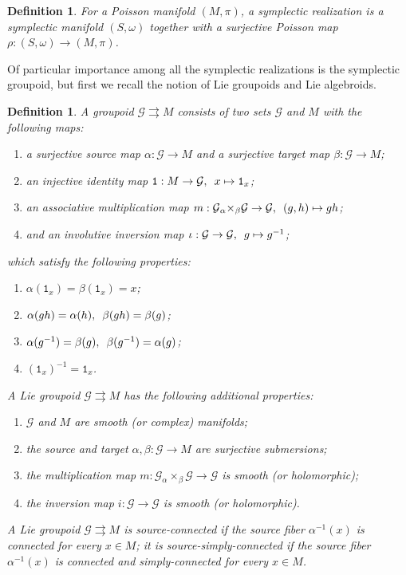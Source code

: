 \documentclass{amsart}
\newtheorem{definition}[theorem]{Definition}
\numberwithin{equation}{section}
\newcommand{\cG}{\mathcal{G}}
\begin{document}
\begin{definition}
  For a Poisson manifold $(M, \pi)$, a symplectic realization is a symplectic manifold $(S, \omega)$ together with a surjective Poisson map $\rho: (S, \omega) \to (M, \pi)$.
\end{definition}

Of particular importance among all the symplectic realizations is the symplectic groupoid, but first we recall the notion of Lie groupoids and Lie algebroids.
\begin{definition} \label{def:groupoid}
  A \emph{groupoid} $\cG\rightrightarrows M$ consists of two sets $\cG$ and $M$ with the following maps:
  \begin{enumerate}
    \item a surjective \emph{source map} $\alpha: \cG \to M$ and a surjective \emph{target map} $\beta: \cG \to M$;
    \item an injective identity map $\mathtt{1}: M \to \cG, \enskip x \mapsto \mathtt{1}_x$;
    \item an associative multiplication map $m: \cG {_\alpha \times_\beta} \cG \to \cG, \enskip (g, h) \mapsto gh$;
    \item and an involutive inversion map $\iota: \cG \to \cG, \enskip g \mapsto g^{-1}$;
  \end{enumerate}
  which satisfy the following properties:
  \begin{enumerate}
    \item $\alpha(\mathtt{1}_x) = \beta(\mathtt{1}_x) = x$;
    \item $\alpha(gh) = \alpha(h), \enskip \beta(gh) = \beta(g)$;
    \item $\alpha(g^{-1}) = \beta(g), \enskip \beta(g^{-1}) = \alpha(g)$;
    \item $(\mathtt{1}_x)^{-1} = \mathtt{1}_x$.
  \end{enumerate}
  A \emph{Lie groupoid} $\cG \rightrightarrows M$ has the following additional properties:
  \begin{enumerate}
    \item $\cG$ and $M$ are smooth (or complex) manifolds;
    \item the source and target $\alpha,\beta: \cG \to M$ are surjective submersions;
    \item the multiplication map $m: \cG {_\alpha \times_\beta} \cG \to \cG$ is smooth (or holomorphic);
    \item the inversion map $i: \cG \to \cG$ is smooth (or holomorphic).
  \end{enumerate}
  A Lie groupoid $\cG \rightrightarrows M$ is \emph{source-connected} if the source fiber $\alpha^{-1}(x)$ is connected for every $x \in M$; it is \emph{source-simply-connected} if the source fiber $\alpha^{-1}(x)$ is connected and simply-connected for every $x \in M$.
\end{definition}
\end{document}
